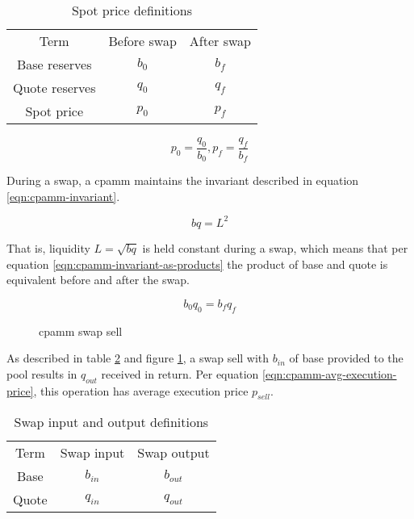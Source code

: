 \documentclass[table, twocolumn]{article}
\begin{document}
\begin{table}[!htb]
  \centering
  \begin{tabular}{|c|c|c|}
    \hline
    \rowcolor{cyan}
    Term           & Before swap & After swap \\
    Base reserves  & $b_0$       & $b_f$      \\
    Quote reserves & $q_0$       & $q_f$      \\
    Spot price     & $p_0$       & $p_f$      \\
    \hline
  \end{tabular}
  \caption{Spot price definitions}
  \label{tab:spot-before-after-swap}
\end{table}

\begin{equation} \label{eqn:price-before-after}
  p_0 = \frac{q_0}{b_0},
  p_f = \frac{q_f}{b_f}
\end{equation}

During a swap, a \gls{cpamm} maintains the invariant described in equation
\ref{eqn:cpamm-invariant}.

\begin{equation} \label{eqn:cpamm-invariant}
  b q = L^2
\end{equation}

That is, liquidity $L = \sqrt{bq}$ is held constant during a swap, which means that per equation
\ref{eqn:cpamm-invariant-as-products} the product of base and quote is equivalent before and after
the swap.

\begin{equation} \label{eqn:cpamm-invariant-as-products}
  b_0 q_0 = b_f q_f
\end{equation}

\begin{figure}[!htb]
  \centering
  
  \caption{\gls{cpamm} swap sell}
  \label{fig:cpamm-swap-sell}
\end{figure}

As described in table \ref{tab:swap-in-out} and figure \ref{fig:cpamm-swap-sell}, a swap sell with
$b_{in}$ of base provided to the pool results in $q_{out}$ received in return. Per equation
\ref{eqn:cpamm-avg-execution-price}, this operation has average execution price $p_{sell}$.

\begin{table}[!htb]
  \centering
  \begin{tabular}{|c|c|c|}
    \hline
    \rowcolor{cyan}
    Term  & Swap input & Swap output \\
    Base  & $b_{in}$   & $b_{out}$   \\
    Quote & $q_{in}$   & $q_{out}$   \\
    \hline
  \end{tabular}
  \caption{Swap input and output definitions}
  \label{tab:swap-in-out}
\end{table}
\end{document}
